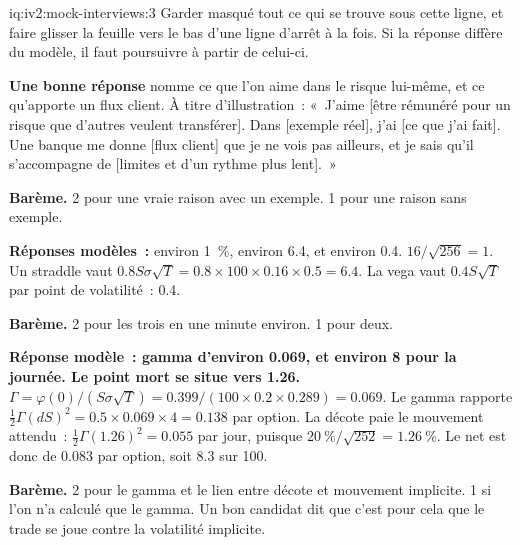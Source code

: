 \begin{solution}{iq:iv2:mock-interviews:3}
Garder masqué tout ce qui se trouve sous cette ligne, et faire glisser la feuille vers le bas d'une ligne d'arrêt à la fois. Si la réponse diffère du modèle, il faut poursuivre à partir de celui-ci.

\ivstop
\textbf{Une bonne réponse} nomme ce que l'on aime dans le risque lui-même, et ce qu'apporte un flux client. À titre d'illustration~: «~J'aime [être rémunéré pour un risque que d'autres veulent transférer]. Dans [exemple réel], j'ai [ce que j'ai fait]. Une banque me donne [flux client] que je ne vois pas ailleurs, et je sais qu'il s'accompagne de [limites et d'un rythme plus lent].~»

\textbf{Barème.} 2 pour une vraie raison avec un exemple. 1 pour une raison sans exemple.

\ivstop
\textbf{Réponses modèles~:} environ 1~\%, environ 6.4, et environ 0.4. $16/\sqrt{256} = 1$. Un straddle vaut $0.8 S\sigma\sqrt{T} = 0.8 \times 100 \times 0.16 \times 0.5 = 6.4$. La vega vaut $0.4 S\sqrt{T}$ par point de volatilité~: 0.4.

\textbf{Barème.} 2 pour les trois en une minute environ. 1 pour deux.

\ivstop
\textbf{Réponse modèle~: gamma d'environ 0.069, et environ 8 pour la journée. Le point mort se situe vers 1.26.} $\Gamma = \varphi(0)/(S\sigma\sqrt{T}) = 0.399/(100 \times 0.2 \times 0.289) = 0.069$. Le gamma rapporte $\tfrac12\Gamma(dS)^2 = 0.5 \times 0.069 \times 4 = 0.138$ par option. La décote paie le mouvement attendu~: $\tfrac12\Gamma(1.26)^2 = 0.055$ par jour, puisque $20~\%/\sqrt{252} = 1.26~\%$. Le net est donc de 0.083 par option, soit 8.3 sur 100.

\textbf{Barème.} 2 pour le gamma et le lien entre décote et mouvement implicite. 1 si l'on n'a calculé que le gamma. Un bon candidat dit que c'est pour cela que le trade se joue contre la volatilité implicite.


\end{solution}
